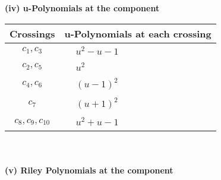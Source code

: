 \documentclass[1p]{elsarticle_modified}
\theoremstyle{definition}
\begin{document}
\newpage\renewcommand{\arraystretch}{1}
\flushleft \textbf{(iv) u-Polynomials at the component}\newline \\
\begin{tabular}{m{50pt}|m{274pt}}
Crossings & \hspace{64pt}u-Polynomials at each crossing \\
\hline $$\begin{aligned}c_{1},c_{3}\end{aligned}$$&$\begin{aligned}
&u^2- u-1
\end{aligned}$\\
\hline $$\begin{aligned}c_{2},c_{5}\end{aligned}$$&$\begin{aligned}
&u^2
\end{aligned}$\\
\hline $$\begin{aligned}c_{4},c_{6}\end{aligned}$$&$\begin{aligned}
&(u-1)^2
\end{aligned}$\\
\hline $$\begin{aligned}c_{7}\end{aligned}$$&$\begin{aligned}
&(u+1)^2
\end{aligned}$\\
\hline $$\begin{aligned}c_{8},c_{9},c_{10}\end{aligned}$$&$\begin{aligned}
&u^2+u-1
\end{aligned}$\\
\hline
\end{tabular}\\~\\
\newpage\renewcommand{\arraystretch}{1}
\flushleft \textbf{(v) Riley Polynomials at the component}\newline \\
\end{document}
